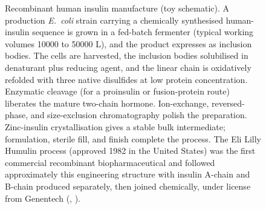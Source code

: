 \begin{figure}[htbp]
\caption{Recombinant human insulin manufacture (toy schematic). A
production \emph{E.\ coli} strain carrying a chemically synthesised
human-insulin sequence is grown in a fed-batch fermenter (typical
working volumes 10000 to 50000 L), and the product expresses as
inclusion bodies. The cells are harvested, the inclusion bodies
solubilised in denaturant plus reducing agent, and the linear chain is
oxidatively refolded with three native disulfides at low protein
concentration. Enzymatic cleavage (for a proinsulin or fusion-protein
route) liberates the mature two-chain hormone. Ion-exchange,
reversed-phase, and size-exclusion chromatography polish the
preparation. Zinc-insulin crystallisation gives a stable bulk
intermediate; formulation, sterile fill, and finish complete the
process. The Eli Lilly Humulin process (approved 1982 in the United
States) was the first commercial recombinant biopharmaceutical and
followed approximately this engineering structure with insulin
A-chain and B-chain produced separately, then joined chemically,
under license from Genentech (\cite{paper:v6c10-goeddel-insulin-1979},
\cite{paper:v6c10-humulin-eli-lilly-1982}).}
\label{fig:vol06ch10:insulin-process}
\end{figure}
